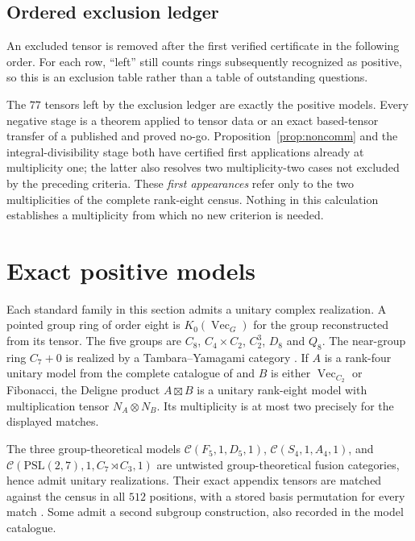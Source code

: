 \documentclass[11pt,reqno]{amsart}
\theoremstyle{definition}
\theoremstyle{remark}
\renewcommand{\Vec}{\operatorname{Vec}}
\begin{document}








\begin{samepage}
\subsection{Ordered exclusion ledger}
An excluded tensor is removed after the first verified certificate in the following order. For each row, ``left'' still counts rings subsequently recognized as positive, so this is an exclusion table rather than a table of outstanding questions.
\begin{center}\small\end{center}
\end{samepage}
The $77$ tensors left by the exclusion ledger are exactly the positive models. Every negative stage is a theorem applied to tensor data or an exact based-tensor transfer of a published and proved no-go. Proposition~\ref{prop:noncomm} and the integral-divisibility stage both have certified first applications already at multiplicity one; the latter also resolves two multiplicity-two cases not excluded by the preceding criteria. These \emph{first appearances} refer only to the two multiplicities of the complete rank-eight census. Nothing in this calculation establishes a multiplicity from which no new criterion is needed.

\section{Exact positive models}\label{sec:models}
Each standard family in this section admits a unitary complex realization. A pointed group ring of order eight is $K_0(\Vec_G)$ for the group reconstructed from its tensor. The five groups are $C_8$, $C_4\times C_2$, $C_2^3$, $D_8$ and $Q_8$. The near-group ring $C_7+0$ is realized by a Tambara--Yamagami category \cite{TY}. If $A$ is a rank-four unitary model from the complete catalogue of \cite{R4} and $B$ is either $\Vec_{C_2}$ or Fibonacci, the Deligne product $A\boxtimes B$ is a unitary rank-eight model with multiplication tensor $N_A\otimes N_B$. Its multiplicity is at most two precisely for the displayed matches.

The three group-theoretical models $\mathcal C(F_5,1,D_5,1)$, $\mathcal C(S_4,1,A_4,1)$, and $\mathcal C(\mathrm{PSL}(2,7),1,C_7\rtimes C_3,1)$ are untwisted group-theoretical fusion categories, hence admit unitary realizations. Their exact appendix tensors are matched against the census in all $512$ positions, with a stored basis permutation for every match \cite[Appendix~C.3.2(3), (6), (11)]{IntegralAppendix}. Some admit a second subgroup construction, also recorded in the model catalogue.
\end{document}
